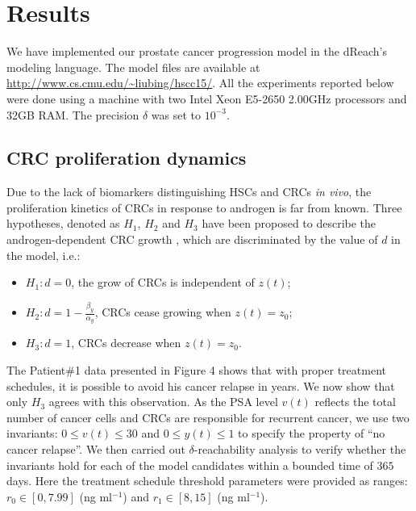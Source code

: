\section{Results}\label{sec.results}

We have implemented our prostate cancer progression model in the dReach's modeling language. The model files are available at \url{http://www.cs.cmu.edu/~liubing/hscc15/}. All the experiments reported below were done using a machine with two Intel Xeon E5-2650 2.00GHz processors and 32GB RAM. The precision $\delta$ was set to $10^{-3}$. 

\subsection{CRC proliferation dynamics}
Due to the lack of biomarkers distinguishing HSCs and CRCs \textit{in vivo}, the proliferation kinetics of CRCs in response to androgen is far from known. Three hypotheses, denoted as $H_1$, $H_2$ and $H_3$ have been proposed to describe the androgen-dependent CRC growth \cite{ideta08}, which are discriminated by the value of $d$ in the model, i.e.:
\begin{itemize}
\item $H_1: d = 0$, the grow of CRCs is independent of $z(t)$;
\item $H_2: d = 1-\frac{\beta_y}{\alpha_y}$, CRCs cease growing when $z(t)=z_0$;
\item $H_3: d = 1$, CRCs decrease when $z(t)=z_0$.
\end{itemize} 

The Patient\#1 data presented in Figure 4 shows that with proper treatment schedules, it is possible to avoid his cancer relapse in years. We now show that only $H_3$ agrees with this observation. As the PSA level $v(t)$ reflects the total number of cancer cells and CRCs are responsible for recurrent cancer, we use two invariants: $0 \le v(t) \le 30$ and $0 \le y(t) \le 1$ to specify the property of ``no cancer relapse''. We then carried out $\delta$-reachability analysis to verify whether the invariants hold for each of the model candidates within a bounded time of $365$ days. Here the treatment schedule threshold parameters were provided as ranges: $r_0 \in [0, 7.99]$ (ng ml$^{-1}$) and $r_1 \in [8,15]$ (ng ml$^{-1}$).


